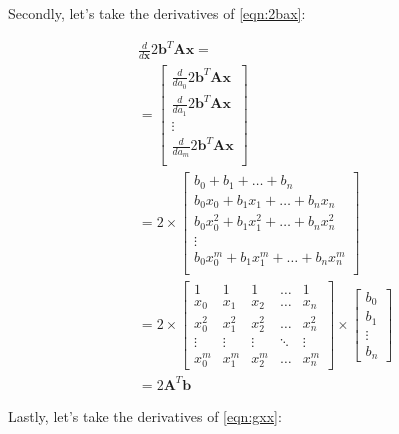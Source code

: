 \documentclass{article}
\newcommand{\x}{\mathbf{x}}
\newcommand{\A}{\mathbf{A}}
\newcommand{\B}{\mathbf{b}} %
\begin{document}
Secondly, let's take the derivatives of \ref{eqn:2bax}:

\begin{equation}
\begin{split}
    & \frac{d}{d\x} 2 \B ^T \A \x = \\
    & =
    \begin{bmatrix}
        \frac{d}{d a_0} 2 \B ^T \A \x \\
        \frac{d}{d a_1} 2 \B ^T \A \x \\
        \vdots \\
        \frac{d}{d a_m} 2 \B ^T \A \x \\
    \end{bmatrix}\\
    & = 2 \times
    \begin{bmatrix}
        b_0 + b_1 + \ldots + b_n \\
        b_0x_0 + b_1x_1 + \ldots + b_nx_n \\
        b_0x_0^2 + b_1x_1^2 + \ldots + b_nx_n^2 \\
        \vdots \\
        b_0x_0^m + b_1x_1^m + \ldots + b_nx_n^m \\
    \end{bmatrix}\\
    &= 2 \times
    \begin{bmatrix}
        1 & 1 & 1 & \ldots & 1 \\
        x_0 & x_1 & x_2 & \ldots & x_n \\
        x_0^2 & x_1^2 & x_2 ^2 & \ldots & x_n^2 \\
        \vdots & \vdots & \vdots & \ddots & \vdots \\
        x_0^m & x_1^m & x_2 ^m & \ldots & x_n^m
    \end{bmatrix}
    \times
    \begin{bmatrix}
        b_0\\
        b_1\\
        \vdots\\
        b_n
    \end{bmatrix}\\
    &= 2 \A ^T \B
\end{split}
\end{equation}

Lastly, let's take the derivatives of \ref{eqn:gxx}:
\end{document}
